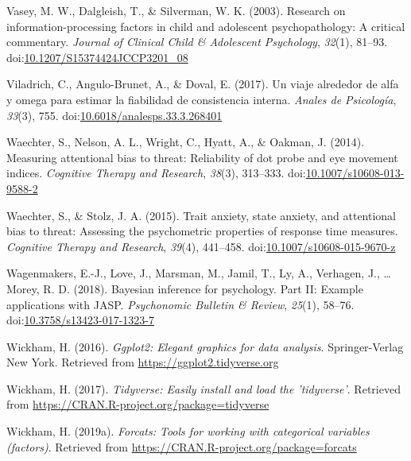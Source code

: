 \documentclass[english,,man,floatsintext]{apa6}
\begin{document}
\leavevmode\hypertarget{ref-vasey_research_2003}{}%
Vasey, M. W., Dalgleish, T., \& Silverman, W. K. (2003). Research on information-processing factors in child and adolescent psychopathology: A critical commentary. \emph{Journal of Clinical Child \& Adolescent Psychology}, \emph{32}(1), 81--93. doi:\href{https://doi.org/10.1207/S15374424JCCP3201_08}{10.1207/S15374424JCCP3201\_08}

\leavevmode\hypertarget{ref-viladrich_viaje_2017}{}%
Viladrich, C., Angulo-Brunet, A., \& Doval, E. (2017). Un viaje alrededor de alfa y omega para estimar la fiabilidad de consistencia interna. \emph{Anales de Psicología}, \emph{33}(3), 755. doi:\href{https://doi.org/10.6018/analesps.33.3.268401}{10.6018/analesps.33.3.268401}

\leavevmode\hypertarget{ref-waechter_measuring_2014}{}%
Waechter, S., Nelson, A. L., Wright, C., Hyatt, A., \& Oakman, J. (2014). Measuring attentional bias to threat: Reliability of dot probe and eye movement indices. \emph{Cognitive Therapy and Research}, \emph{38}(3), 313--333. doi:\href{https://doi.org/10.1007/s10608-013-9588-2}{10.1007/s10608-013-9588-2}

\leavevmode\hypertarget{ref-waechter_trait_2015}{}%
Waechter, S., \& Stolz, J. A. (2015). Trait anxiety, state anxiety, and attentional bias to threat: Assessing the psychometric properties of response time measures. \emph{Cognitive Therapy and Research}, \emph{39}(4), 441--458. doi:\href{https://doi.org/10.1007/s10608-015-9670-z}{10.1007/s10608-015-9670-z}

\leavevmode\hypertarget{ref-wagenmakers_bayesian_2018-2}{}%
Wagenmakers, E.-J., Love, J., Marsman, M., Jamil, T., Ly, A., Verhagen, J., \ldots{} Morey, R. D. (2018). Bayesian inference for psychology. Part II: Example applications with JASP. \emph{Psychonomic Bulletin \& Review}, \emph{25}(1), 58--76. doi:\href{https://doi.org/10.3758/s13423-017-1323-7}{10.3758/s13423-017-1323-7}

\leavevmode\hypertarget{ref-R-ggplot2}{}%
Wickham, H. (2016). \emph{Ggplot2: Elegant graphics for data analysis}. Springer-Verlag New York. Retrieved from \url{https://ggplot2.tidyverse.org}

\leavevmode\hypertarget{ref-R-tidyverse}{}%
Wickham, H. (2017). \emph{Tidyverse: Easily install and load the 'tidyverse'}. Retrieved from \url{https://CRAN.R-project.org/package=tidyverse}

\leavevmode\hypertarget{ref-R-forcats}{}%
Wickham, H. (2019a). \emph{Forcats: Tools for working with categorical variables (factors)}. Retrieved from \url{https://CRAN.R-project.org/package=forcats}
\end{document}
